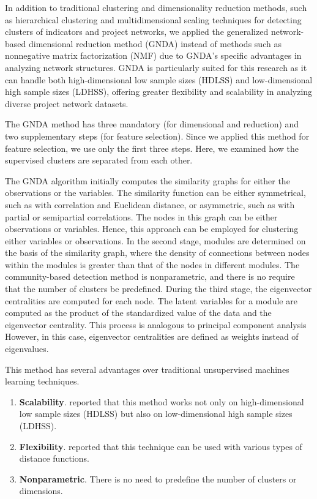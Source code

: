 \documentclass[preprint,
3p]{elsarticle} %
\providecommand{\tightlist}{%
  \setlength{\itemsep}{0pt}\setlength{\parskip}{0pt}}
\begin{document}
In addition to traditional clustering and dimensionality reduction
methods, such as hierarchical clustering and multidimensional scaling
techniques for detecting clusters of indicators and project networks, we
applied the generalized network-based dimensional reduction method
(GNDA) \citep{kosztyan2023network} instead of methods such as
nonnegative matrix factorization (NMF) \citep{saberi2024nonnegative} due
to GNDA's specific advantages in analyzing network structures. GNDA is
particularly suited for this research as it can handle both
high-dimensional low sample sizes (HDLSS) and low-dimensional high
sample sizes (LDHSS), offering greater flexibility and scalability in
analyzing diverse project network datasets.

The GNDA method has three mandatory (for dimensional and reduction) and
two supplementary steps (for feature selection). Since we applied this
method for feature selection, we use only the first three steps. Here,
we examined how the supervised clusters are separated from each other.

The GNDA algorithm initially computes the similarity graphs for either
the observations or the variables. The similarity function can be either
symmetrical, such as with correlation and Euclidean distance, or
asymmetric, such as with partial or semipartial correlations. The nodes
in this graph can be either observations or variables. Hence, this
approach can be employed for clustering either variables or
observations. In the second stage, modules are determined on the basis
of the similarity graph, where the density of connections between nodes
within the modules is greater than that of the nodes in different
modules. The community-based detection method is nonparametric, and
there is no require that the number of clusters be predefined. During
the third stage, the eigenvector centralities are computed for each
node. The latent variables for a module are computed as the product of
the standardized value of the data and the eigenvector centrality. This
process is analogous to principal component analysis However, in this
case, eigenvector centralities are defined as weights instead of
eigenvalues.

This method has several advantages over traditional unsupervised
machines learning techniques.

\begin{enumerate}
\def\labelenumi{\arabic{enumi}.}
\tightlist
\item
  \textbf{Scalability}. \citet{kosztyan2022network} reported that this
  method works not only on high-dimensional low sample sizes (HDLSS) but
  also on low-dimensional high sample sizes (LDHSS).
\item
  \textbf{Flexibility}. \citet{kosztyan2023network} reported that this
  technique can be used with various types of distance functions.
\item
  \textbf{Nonparametric}. There is no need to predefine the number of
  clusters or dimensions.
\end{enumerate}
\end{document}
